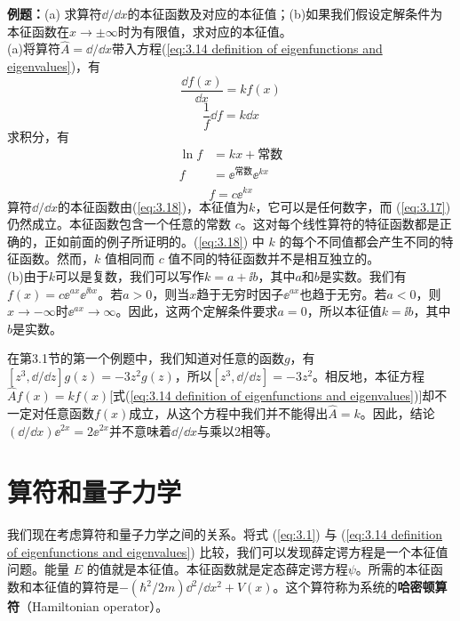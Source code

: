 	\begin{examplebox}
		\textbf{例题：}(a) 求算符$\dd /\dd x$的本征函数及对应的本征值；(b)如果我们假设定解条件为本征函数在$x \to \pm \infty$时为有限值，求对应的本征值。\\
		
		(a)将算符$\hat{A} = \dd /\dd x$带入方程(\ref{eq:3.14 definition of eigenfunctions and eigenvalues})，有
		\begin{equation}
			\frac{\dd f\left(x\right)}{\dd x} = kf\left(x\right)
			\label{eq:3.17}
		\end{equation}
		\begin{equation*}
			\frac{1}{f}\dd f = k \dd x
		\end{equation*}
		求积分，有
		\begin{equation*}
			\begin{aligned}
				\ln f & = kx + \text{常数} \\
				f & = \ee ^{\text{常数}}\ee ^{kx} \\
			\end{aligned}
		\end{equation*}
		\begin{equation}
			f  = c\ee ^{kx}
			\label{eq:3.18}
		\end{equation}
		算符$\dd /\dd x$的本征函数由(\ref{eq:3.18})，本征值为$k$，它可以是任何数字，而 (\ref{eq:3.17}) 仍然成立。本征函数包含一个任意的常数 $c$。这对每个线性算符的特征函数都是正确的，正如前面的例子所证明的。(\ref{eq:3.18}) 中 $k$ 的每个不同值都会产生不同的特征函数。然而，$k$ 值相同而 $c$ 值不同的特征函数并不是相互独立的。\\
		(b)由于$k$可以是复数，我们可以写作$k = a+\ii b$，其中$a$和$b$是实数。我们有$f\left(x\right) = c\ee ^{ax}\ee ^{\ii bx}$。若$a>0$，则当$x$趋于无穷时因子$\ee ^{ax}$也趋于无穷。若$a<0$，则$x \to - \infty$时$\ee ^{ax} \to \infty$。因此，这两个定解条件要求$a=0$，所以本征值$k=\ii b$，其中$b$是实数。
	\end{examplebox}

	在第3.1节的第一个例题中，我们知道对任意的函数$g$，有$\left[z^3,\dd /\dd z\right]g\left(z\right) = -3z^2g\left(z\right)$，所以$\left[z^3,\dd /\dd z\right] = -3z^2$。相反地，本征方程$\hat{A}f\left(x\right) = kf\left(x\right)$[式(\ref{eq:3.14 definition of eigenfunctions and eigenvalues})]却不一定对任意函数$f\left(x\right)$成立，从这个方程中我们并不能得出$\hat{A}=k$。因此，结论$\left(\dd /\dd x\right)\ee ^{2x} = 2\ee ^{2x}$并不意味着$\dd /\dd x$与乘以2相等。
	
\section{算符和量子力学}
\label{sec:3.3 Operators and Quantum Mechanics}
	我们现在考虑算符和量子力学之间的关系。将式 (\ref{eq:3.1}) 与 (\ref{eq:3.14 definition of eigenfunctions and eigenvalues}) 比较，我们可以发现薛定谔方程是一个本征值问题。能量 $E$ 的值就是本征值。本征函数就是定态薛定谔方程$\psi$。所需的本征函数和本征值的算符是$-\left(\hbar^2/2m\right)\dd ^2/\dd x^2+V\left(x\right)$。这个算符称为系统的\textbf{哈密顿算符}（Hamiltonian operator）。

